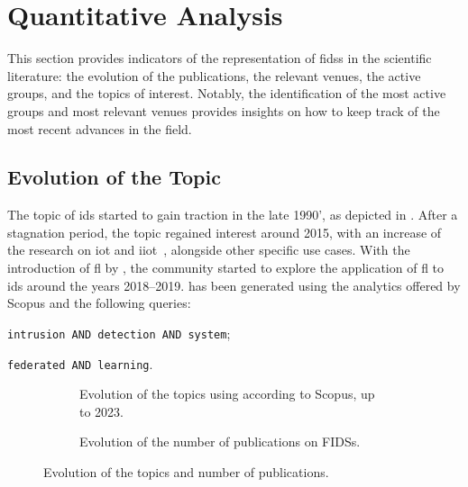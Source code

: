 \section{Quantitative Analysis\label{sec:sota.quanti}}

This section provides indicators of the representation of \glspl{fids} in the scientific literature: the evolution of the publications, the relevant venues, the active groups, and the topics of interest.
Notably, the identification of the most active groups and most relevant venues provides insights on how to keep track of the most recent advances in the field.

\subsection{Evolution of the Topic\label{sec:sota.quanti.time}}

The topic of \gls{ids} started to gain traction in the late 1990', as depicted in .
After a stagnation period, the topic regained interest around 2015, with an increase of the research on \gls{iot} and \gls{iiot}~\cite{doshi_MachineLearningDDoS_2018,chaabouni_NetworkIntrusionDetection_2019}, alongside other specific use cases.
With the introduction of \gls{fl} by \textcite{mcmahan_Communicationefficientlearningdeep_2017}, the community started to explore the application of \gls{fl} to \gls{ids} around the years 2018--2019.
 has been generated using the analytics offered by Scopus and the following queries: 
\begin{queries}
  \item \texttt{intrusion AND detection AND system}; \label{qry:ids}
  \item \texttt{federated AND learning}. \label{qry:fl}
\end{queries}

\begin{figure}
  \centering
  \begin{subfigure}{0.48\textwidth}
    \centering
    
    \caption{
      Evolution of the topics using  according to Scopus, up to 2023.
      \label{fig:sota.evol-topics}
    }
  \end{subfigure}
  \hfill
  \begin{subfigure}{0.48\textwidth}
    \centering
    
    \caption{
      Evolution of the number of publications on FIDSs.
      \label{fig:sota.evol-fids}
    }
  \end{subfigure}
  \caption{
    Evolution of the topics and number of publications.
    \label{fig:sota.evol}
  }
\end{figure}

